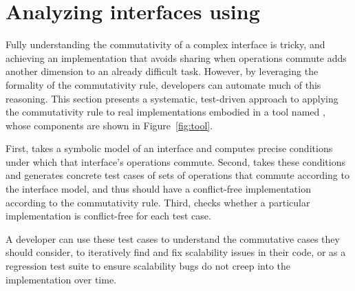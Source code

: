 
\section{Analyzing interfaces using \tool{}}
\label{sec:model}


\cbstart Fully understanding the commutativity of a complex interface is
tricky, and achieving an
implementation that avoids sharing when operations commute adds another
dimension to an already difficult task.  However, by leveraging the
formality of the commutativity rule, developers can automate much of this
reasoning.  This section presents a systematic, test-driven approach to
applying the commutativity rule to real implementations embodied in a
tool named \tool, whose components are shown in
Figure~\ref{fig:tool}. \cbend


\begin{figure*}

\caption{The components of \tool{}.}
\label{fig:tool}
\end{figure*}

First, \analyzer{} takes a symbolic model of
an interface and computes precise conditions under which that interface's
operations commute.  Second, \generator{} takes
these conditions and generates concrete test cases of sets of operations
that commute according to the interface model, and thus should
have a conflict-free implementation according to the commutativity rule.
%
Third, \mtrace checks whether a particular implementation is
conflict-free for each test case.

\cbstart A developer can use these test cases to understand the
commutative cases they should consider,
to iteratively find and fix scalability
issues in their
code, or as a regression test suite to ensure
scalability bugs do not creep into the implementation over time.
\cbend


